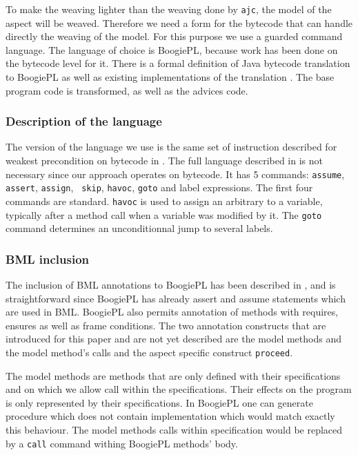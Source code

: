 To make the weaving lighter than the weaving done by {\tt ajc}, 
the model of the aspect  will be weaved. Therefore we need a form
for the bytecode that can handle directly the weaving of the model.
For this purpose we use a guarded command language. The language of 
choice is BoogiePL, because work has been done on the bytecode level for it.
There is a formal definition of Java bytecode translation to BoogiePL 
\cite{LehnerM07} as well as existing implementations of the translation
\cite{javatrans07,coqtrans06}. The base program code is transformed, as well
as the advices code.

\subsubsection{Description of the language} 
The version of the language we use is the same set of instruction
described for weakest precondition on bytecode in \cite{BarnettL05}.
The full language described in \cite{DeLineL05} is not necessary
since our approach operates on bytecode.
It has 5 commands: {\tt assume}, {\tt assert}, {\tt assign}, {\tt
skip}, {\tt havoc}, {\tt goto} and label expressions.  The first four
commands are standard. {\tt havoc} is used to assign an arbitrary to a
variable, typically after a method call when a variable was modified
by it.  The {\tt goto} command determines an unconditionnal jump to
several labels.

\subsubsection{BML inclusion}
The inclusion of BML annotations to BoogiePL has been described in 
\cite{javatrans07}, and is straightforward since BoogiePL has already 
assert and assume statements which are used in BML.  BoogiePL also
permits annotation of methods with requires, ensures as well as frame
conditions.  The two annotation constructs that are introduced for
this paper and are not yet described are the model methods and the
model method's calls and the aspect specific construct {\tt proceed}.

The model methods are methods that are only defined with their
specifications and on which we allow call within the
specifications. Their effects on the program is only represented by
their specifications. In BoogiePL one can generate procedure which 
does not contain implementation which would match exactly this behaviour.
The model methods calls within specification would be replaced by a
{\tt call} command withing BoogiePL methods' body.

